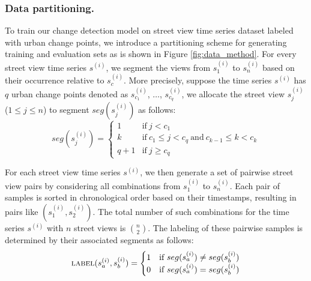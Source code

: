 \documentclass[letterpaper]{article} %
\begin{document}
\subsubsection{Data partitioning.}
To train our change detection model on street view time series dataset labeled with urban change points, we introduce a partitioning scheme for generating training and evaluation sets as is shown in Figure \ref{fig:data_method}. For every street view time series $s^{(i)}$, we segment the views from $s_1^{(i)}$ to $s_n^{(i)}$ based on their occurrence relative to $s_c^{(i)}$. More precisely, suppose the time series $s^{(i)}$ has $q$ urban change points denoted as $s_{c_1}^{(i)}$, $\ldots$, $s_{c_q}^{(i)}$, we allocate the street view $s_j^{(i)}$ ($1\leq j\leq n$) to segment $seg(s_j^{(i)})$ as follows:
\begin{equation}
    seg(s_j^{(i)})=
    \begin{cases}
    1 & \text{if}\ j<c_1\\
    k & \text{if}\ c_1\leq j < c_q\ \text{and}\ c_{k-1}\leq k<c_k\\
    q+1 & \text{if}\ j \geq c_q
    \end{cases}
\end{equation}


For each street view time series $s^{(i)}$, we then generate a set of pairwise street view pairs by considering all combinations from $s_1^{(i)}$ to $s_n^{(i)}$. Each pair of samples is sorted in chronological order based on their timestamps, resulting in pairs like $(s_1^{(i)}, s_2^{(i)})$. The total number of such combinations for the time series $s^{(i)}$ with $n$ street views is $\binom{n}{2}$. The labeling of these pairwise samples is determined by their associated segments as follows:
\begin{equation}
    \textsc{label}{(s_a^{(i)},s_b^{(i)})}=
    \begin{cases}
        1 & \text{if}\ seg(s_a^{(i)})\neq seg(s_b^{(i)})\\
        0 & \text{if}\ seg(s_a^{(i)}) = seg(s_b^{(i)})
    \end{cases}
\end{equation}
\end{document}
